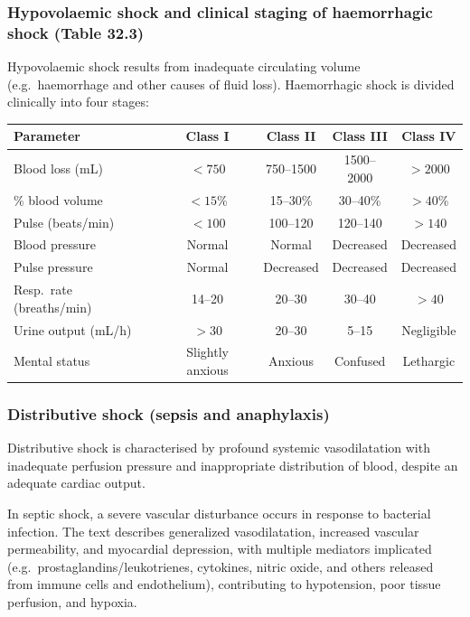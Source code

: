 \documentclass[11pt,a4paper]{article}
\begin{document}
\subsubsection{Hypovolaemic shock and clinical staging of haemorrhagic shock (Table 32.3)}
Hypovolaemic shock results from inadequate circulating volume (e.g.\ haemorrhage and other causes of fluid loss). Haemorrhagic shock is divided clinically into four stages:

\begin{center}
\small
\begin{tabular}{|l|c|c|c|c|}
\hline
\textbf{Parameter} & \textbf{Class I} & \textbf{Class II} & \textbf{Class III} & \textbf{Class IV} \\
\hline
Blood loss (mL) & $<750$ & 750--1500 & 1500--2000 & $>2000$ \\
\hline
\% blood volume & $<15$\% & 15--30\% & 30--40\% & $>40$\% \\
\hline
Pulse (beats/min) & $<100$ & 100--120 & 120--140 & $>140$ \\
\hline
Blood pressure & Normal & Normal & Decreased & Decreased \\
\hline
Pulse pressure & Normal & Decreased & Decreased & Decreased \\
\hline
Resp.\ rate (breaths/min) & 14--20 & 20--30 & 30--40 & $>40$ \\
\hline
Urine output (mL/h) & $>30$ & 20--30 & 5--15 & Negligible \\
\hline
Mental status & Slightly anxious & Anxious & Confused & Lethargic \\
\hline
\end{tabular}
\end{center}

\subsubsection{Distributive shock (sepsis and anaphylaxis)}
Distributive shock is characterised by profound systemic vasodilatation with inadequate perfusion pressure and inappropriate distribution of blood, despite an adequate cardiac output.

In septic shock, a severe vascular disturbance occurs in response to bacterial infection. The text describes generalized vasodilatation, increased vascular permeability, and myocardial depression, with multiple mediators implicated (e.g.\ prostaglandins/leukotrienes, cytokines, nitric oxide, and others released from immune cells and endothelium), contributing to hypotension, poor tissue perfusion, and hypoxia.
\end{document}
